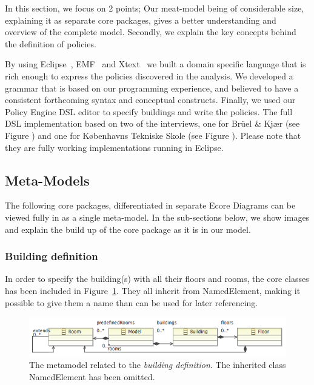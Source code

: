 In this section, we focus on 2 points; Our meat-model being of considerable size, explaining it as separate core packages, gives a better understanding and overview of the complete model. Secondly, we explain the key concepts behind the definition of policies.
 
By using Eclipse~\cite{eclipse}, EMF~\cite{emf} and Xtext~\cite{xtext} we built a domain specific language that is rich enough to express the policies discovered in the analysis. We developed a grammar that is based on our programming experience, and believed to have a consistent forthcoming syntax and conceptual constructs. Finally, we used our Policy Engine DSL editor to specify buildings and write the policies. The full DSL implementation based on two of the interviews, one for Br\"{u}el \& Kj\ae r (see Figure ) and one for K\o benhavns Tekniske Skole (see Figure ). Please note that they are fully working implementations running in Eclipse.

\subsection{Meta-Models}

The following core packages, differentiated in separate Ecore Diagrams can be viewed fully in  as a single meta-model. In the sub-sections below, we show images and explain the build up of the core package as it is in our model. 

\subsubsection{Building definition}
In order to specify the building(s) with all their floors and rooms, the core classes has been included in Figure \ref{fig:ecore-building-definition}. They all inherit from NamedElement, making it possible to give them a name than can be used for later referencing.
\begin{figure}[h]
  \centering \includegraphics[scale=.5]{ecore-building-definition.png}  
	\caption{The metamodel related to the \textit{building definition}. The inherited class NamedElement has been omitted.}
	\label{fig:ecore-building-definition}
\end{figure}

